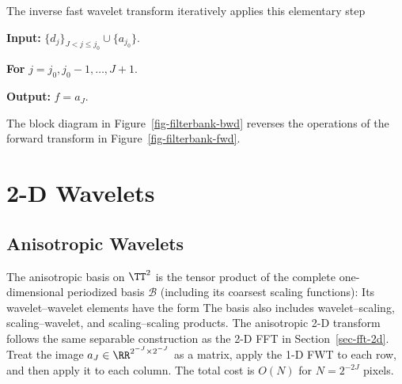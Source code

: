 The inverse fast wavelet transform iteratively applies this elementary step
\begin{rs}
	\item \textbf{Input:} $\{d_j\}_{J<j\leq j_0} \cup \{ a_{j_0} \}$.
	\item \textbf{For} $j=j_0,j_0-1,\ldots,J+1$.
	\item \textbf{Output:} $f = a_J$.
\end{rs}
The block diagram in Figure~\ref{fig-filterbank-bwd} reverses the operations of the forward transform in Figure~\ref{fig-filterbank-fwd}.



                                                   
                                                   
                                                   
\section{2-D Wavelets}

                                                   
\subsection{Anisotropic Wavelets}

The anisotropic basis on $\TT^2$ is the tensor product of the complete one-dimensional periodized basis $\mathcal B$ (including its coarsest scaling functions):
Its wavelet--wavelet elements have the form
The basis also includes wavelet--scaling, scaling--wavelet, and scaling--scaling products.
The anisotropic 2-D transform follows the same separable construction as the 2-D FFT in Section~\ref{sec-fft-2d}. Treat the image $a_J \in \RR^{2^{-J} \times 2^{-J}}$ as a matrix, apply the 1-D FWT to each row, and then apply it to each column. The total cost is $O(N)$ for $N=2^{-2J}$ pixels.


